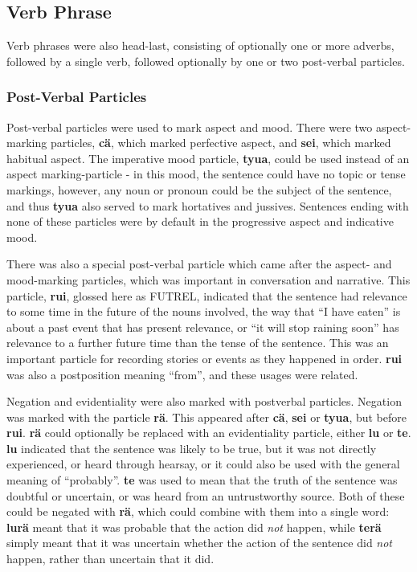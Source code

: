 \documentclass{article}
\begin{document}
\subsection{Verb Phrase}

Verb phrases were also head-last, consisting of optionally one or more adverbs, followed by a single verb, followed optionally by one or two post-verbal particles.

\subsubsection{Post-Verbal Particles}

Post-verbal particles were used to mark aspect and mood.  There were two aspect-marking particles, \textbf{c\"a}, which marked perfective aspect, and \textbf{sei}, which marked habitual aspect.  The imperative mood particle, \textbf{tyua}, could be used instead of an aspect marking-particle - in this mood, the sentence could have no topic or tense markings, however, any noun or pronoun could be the subject of the sentence, and thus \textbf{tyua} also served to mark hortatives and jussives.  Sentences ending with none of these particles were by default in the progressive aspect and indicative mood.

There was also a special post-verbal particle which came after the aspect- and mood-marking particles, which was important in conversation and narrative.  This particle, \textbf{rui}, glossed here as \textsc{FUTREL}, indicated that the sentence had relevance to some time in the future of the nouns involved, the way that ``I have eaten'' is about a past event that has present relevance, or ``it will stop raining soon'' has relevance to a further future time than the tense of the sentence.  This was an important particle for recording stories or events as they happened in order.  \textbf{rui} was also a postposition meaning ``from'', and these usages were related.

Negation and evidentiality were also marked with postverbal particles.  Negation was marked with the particle \textbf{r\"a}.  This appeared after \textbf{c\"a}, \textbf{sei} or \textbf{tyua}, but before \textbf{rui}.  \textbf{r\"a} could optionally be replaced with an evidentiality particle, either \textbf{lu} or \textbf{te}.  \textbf{lu} indicated that the sentence was likely to be true, but it was not directly experienced, or heard through hearsay, or it could also be used with the general meaning of ``probably''.  \textbf{te} was used to mean that the truth of the sentence was doubtful or uncertain, or was heard from an untrustworthy source.  Both of these could be negated with \textbf{r\"a}, which could combine with them into a single word: \textbf{lur\"a} meant that it was probable that the action did \emph{not} happen, while \textbf{ter\"a} simply meant that it was uncertain whether the action of the sentence did \emph{not} happen, rather than uncertain that it did.
\end{document}
